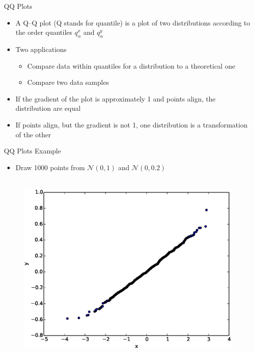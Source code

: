 \documentclass{beamer}
\begin{document}
\begin{frame}{QQ Plots} 
\begin{itemize}
 \item A Q–Q plot (Q stands for quantile) is a plot of two distributions according to the order quantiles $q_\alpha^x$ and $q_\alpha^y$
 \item Two applications 
 \begin{itemize}
 \item Compare data within quantiles for a distribution to a theoretical one 
 \item Compare two data samples 
 \end{itemize}
 \item If the gradient of the plot is approximately 1 and points align, the distribution are equal 
 \item If points align, but the gradient is not 1, one distribution is a transformation of the other 
\end{itemize}
\end{frame}

\begin{frame}{QQ Plots Example}  
\begin{itemize}
 \item Draw 1000 points from $\mathcal{N}(0, 1)$ and $\mathcal{N}(0, 0.2)$ 
\end{itemize}

   \begin{figure}[htp]
\mbox{
\includegraphics[width=0.5\linewidth]{QQPlot.eps}
}
\end{figure} 
\end{frame}
\end{document}
